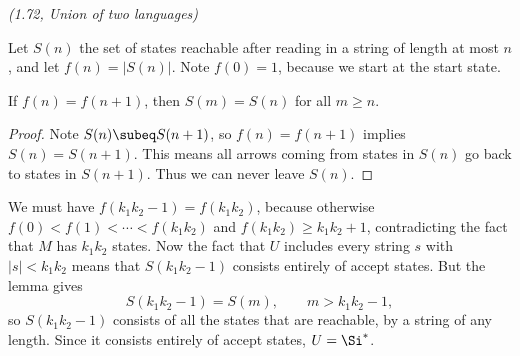\begin{problem}{\it(1.72, Union of two languages)}
\begin{enumerate}
Let $S(n)$ the set of states reachable after reading in a string of length at most $n$, and let $f(n)=|S(n)|$. Note $f(0)=1$, because we start at the start state.
\begin{clm}
If $f(n)=f(n+1)$, then $S(m)=S(n)$ for all $m\ge n$.
\end{clm}
\begin{proof}
Note $S(n)\subeq S(n+1)$, so $f(n)=f(n+1)$ implies $S(n)=S(n+1)$. This means all arrows coming from states in $S(n)$ go back to states in $S(n+1)$. Thus we can never leave $S(n)$.
\end{proof}
We must have $f(k_1k_2-1)=f(k_1k_2)$, because otherwise $f(0)<f(1)<\cdots <f(k_1k_2)$ and $f(k_1k_2)\ge k_1k_2+1$, contradicting the fact that $M$ has $k_1k_2$ states. Now the fact that $U$ includes every string $s$ with $|s|<k_1k_2$ means that $S(k_1k_2-1)$ consists entirely of accept states. But the lemma gives
\[
S(k_1k_2-1)=S(m),\qquad m>k_1k_2-1,
\]
so $S(k_1k_2-1)$ consists of all the states that are reachable, by a string of any length. Since it consists entirely of accept states, $U=\Si^*$.
\end{enumerate}
\end{problem}

\pagebreak

